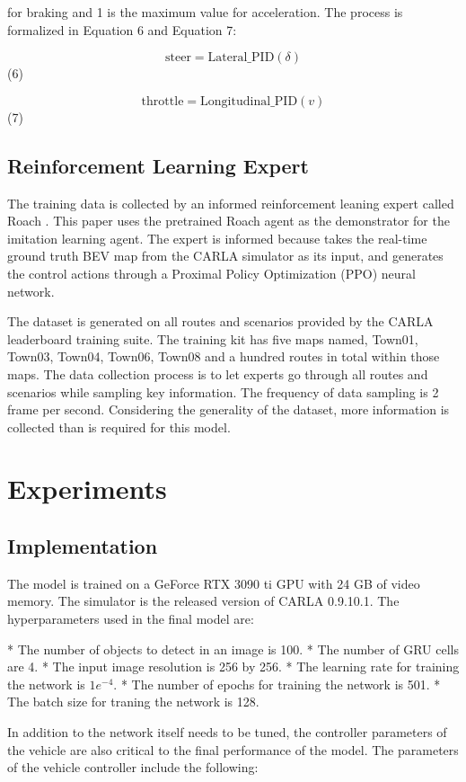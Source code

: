 \documentclass[conference]{IEEEtran}
\begin{document}
for braking and 1 is the maximum value for acceleration. The process is formalized in Equation 6 and Equation 7:

\[\mathrm{steer}=\mathrm{Lateral\_PID}(\delta)\] (6)

\[\mathrm{throttle}=\mathrm{Longitudinal\_PID}(v)\] (7)

\subsection{Reinforcement Learning Expert}

The training data is collected by an informed reinforcement leaning expert called Roach \cite{zhang2021end}. This paper uses the pretrained Roach agent as the demonstrator for the imitation learning agent. The expert is informed because takes the real-time ground truth BEV map from the CARLA simulator as its input, and generates the control actions through a Proximal Policy Optimization (PPO) \cite{schulman2017proximal} neural network.

The dataset is generated on all routes and scenarios provided by the CARLA leaderboard training suite. The training kit has five maps named, Town01, Town03, Town04, Town06, Town08 and a hundred routes in total within those maps. The data collection process is to let experts go through all routes and scenarios while sampling key information. The frequency of data sampling is 2 frame per second. Considering the generality of the dataset, more information is collected than is required for this model.

\section{Experiments}
\subsection{Implementation}

The model is trained on a GeForce RTX 3090 ti GPU with 24 GB of video memory. The simulator is the released version of CARLA 0.9.10.1. The hyperparameters used in the final model are:

* The number of objects to detect in an image is 100.
* The number of GRU cells are 4.
* The input image resolution is 256 by 256.
* The learning rate for training the network is \(1e^{-4}\).
* The number of epochs for training the network is 501.
* The batch size for traning the network is 128.

In addition to the network itself needs to be tuned, the controller parameters of the vehicle are also critical to the final performance of the model. The parameters of the vehicle controller include the following:
\end{document}
